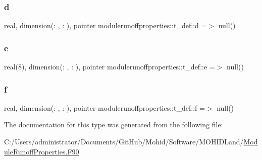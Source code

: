 \subsubsection{\texorpdfstring{d}{d}}
{\footnotesize\ttfamily real, dimension(\+: , \+: ), pointer modulerunoffproperties\+::t\+\_\+def\+::d =$>$ null()\hspace{0.3cm}{\ttfamily [private]}}

\mbox{\label{structmodulerunoffproperties_1_1t__def_a88e594de466ff3bae61465bdbab180b4}} 
\subsubsection{\texorpdfstring{e}{e}}
{\footnotesize\ttfamily real(8), dimension(\+: , \+: ), pointer modulerunoffproperties\+::t\+\_\+def\+::e =$>$ null()\hspace{0.3cm}{\ttfamily [private]}}

\mbox{\label{structmodulerunoffproperties_1_1t__def_a922ef5d5498fbc1b2e5a8aa4c9f9472d}} 
\subsubsection{\texorpdfstring{f}{f}}
{\footnotesize\ttfamily real, dimension(\+: , \+: ), pointer modulerunoffproperties\+::t\+\_\+def\+::f =$>$ null()\hspace{0.3cm}{\ttfamily [private]}}



The documentation for this type was generated from the following file\+:\begin{DoxyCompactItemize}
\item 
C\+:/\+Users/administrator/\+Documents/\+Git\+Hub/\+Mohid/\+Software/\+M\+O\+H\+I\+D\+Land/\mbox{\hyperlink{_module_runoff_properties_8_f90}{Module\+Runoff\+Properties.\+F90}}\end{DoxyCompactItemize}
